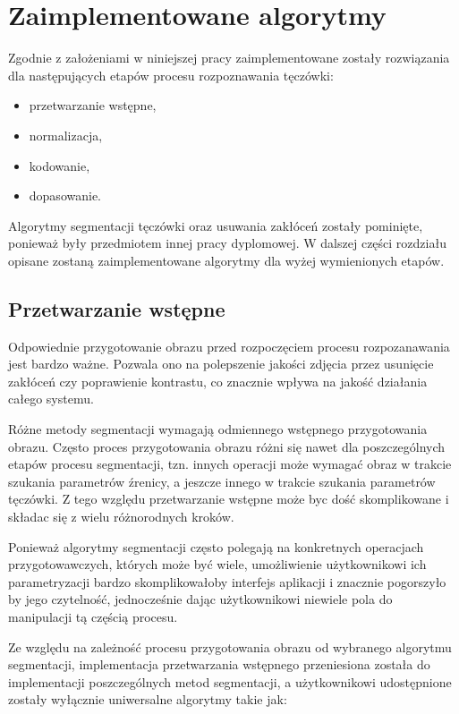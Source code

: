 \chapter{Zaimplementowane algorytmy}

Zgodnie z założeniami w niniejszej pracy zaimplementowane zostały rozwiązania dla następujących
etapów procesu rozpoznawania tęczówki:

\begin{itemize}
  \item przetwarzanie wstępne,
  \item normalizacja,
  \item kodowanie,
  \item dopasowanie.
\end{itemize}

\noindent
Algorytmy segmentacji tęczówki oraz usuwania zakłóceń zostały pominięte, ponieważ były przedmiotem
innej pracy dyplomowej. W dalszej części rozdziału opisane zostaną zaimplementowane algorytmy
dla wyżej wymienionych etapów.

\section{Przetwarzanie wstępne}

Odpowiednie przygotowanie obrazu przed rozpoczęciem procesu rozpozanawania jest bardzo ważne. Pozwala
ono na polepszenie jakości zdjęcia przez usunięcie zakłóceń czy poprawienie kontrastu, co znacznie
wpływa na jakoś\'c działania całego systemu.\newline

Różne metody segmentacji wymagają odmiennego wstępnego przygotowania obrazu. Często proces przygotowania
obrazu różni się nawet dla poszczególnych etapów procesu segmentacji, tzn. innych operacji może wymaga\'c
obraz w trakcie szukania parametrów źrenicy, a jeszcze innego w trakcie szukania parametrów tęczówki.
Z tego względu przetwarzanie wstępne może byc doś\'c skomplikowane i składac się z wielu różnorodnych
kroków.

Ponieważ algorytmy segmentacji często polegają na konkretnych operacjach przygotowawczych, których może
by\'c wiele, umożliwienie użytkownikowi ich parametryzacji bardzo skomplikowałoby interfejs aplikacji
i znacznie pogorszyło by jego czytelnoś\'c, jednocześnie dając użytkownikowi niewiele pola do manipulacji
tą częścią procesu.\newline

Ze względu na zależnoś\'c procesu przygotowania obrazu od wybranego algorytmu segmentacji, implementacja
przetwarzania wstępnego przeniesiona została do implementacji poszczególnych metod segmentacji,
a użytkownikowi udostępnione zostały wyłącznie uniwersalne algorytmy takie jak:

